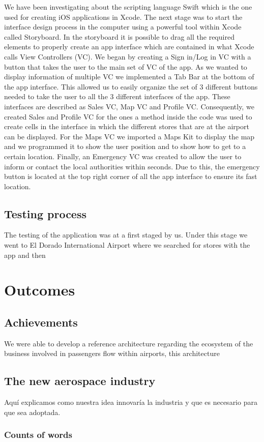 \documentclass[12pt]{article}
\newcommand\wordcount{
}
\begin{document}
We have been investigating about the scripting language Swift which is the one used for creating iOS applications in Xcode. The next stage was to start the interface design process in the computer using a powerful tool within Xcode called Storyboard. In the storyboard it is possible to drag all the required elements to properly create an app interface which are contained in what Xcode calls View Controllers (VC). We began by creating a Sign in/Log in VC with a button that takes the user to the main set of VC of the app. As we wanted to display information of multiple VC we implemented a Tab Bar at the bottom of the app interface. This allowed us to easily organize the set of 3 different buttons needed to take the user to all the 3 different interfaces of the app. These interfaces are described as Sales VC, Map VC and Profile VC. Consequently, we created Sales and Profile VC for the ones a method inside the code was used to create cells in the interface in which the different stores that are at the airport can be displayed. For the Maps VC we imported a Maps Kit to display the map and we programmed it to show the user position and to show how to get to a certain location. Finally, an Emergency VC was created to allow the user to inform or contact the local authorities within seconds. Due to this, the emergency button is located at the top right corner of all the app interface to ensure its fast location.\\

\subsection{Testing process}

The testing of the application was at a first staged by us. Under this stage we went to El Dorado International Airport where we searched for stores with the app and then 


\section{Outcomes}

\subsection{Achievements}

We were able to develop a reference architecture regarding the ecosystem of the business involved in passengers flow within airports, this architecture 

\subsection{The new aerospace industry}
Aquí explicamos como nuestra idea innovaría la industria y que es necesario para que sea adoptada.



\subsubsection*{Counts of words} 
\wordcount
\end{document}
